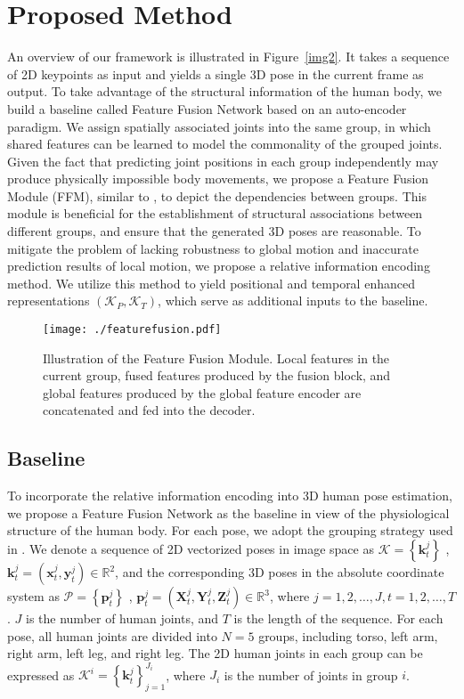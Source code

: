 \documentclass[sigconf]{acmart}
\begin{document}
\section{Proposed Method}
An overview of our framework is illustrated in Figure~\ref{img2}. It takes a sequence of 2D keypoints as input and yields a single 3D pose in the current frame as output. To take advantage of the structural information of the human body, we build a baseline called Feature Fusion Network based on an auto-encoder paradigm. We assign spatially associated joints into the same group, in which shared features can be learned to model the commonality of the grouped joints. Given the fact that predicting joint positions in each group independently may produce physically impossible body movements, we propose a Feature Fusion Module (FFM), similar to \cite{zeng2020srnet}, to depict the dependencies between groups. This module is beneficial for the establishment of structural associations between different groups, and ensure that the generated 3D poses are reasonable. To mitigate the problem of lacking robustness to global motion and inaccurate prediction results of local motion, we propose a relative information encoding method. We utilize this method to yield positional and temporal enhanced representations $(\mathcal{K}_{P},\mathcal{K}_{T})$, which serve as additional inputs to the baseline.

\begin{figure}
  \centering
  \texttt{[image: ./featurefusion.pdf]}
  \vspace{-0.4cm}
  \caption{Illustration of the Feature Fusion Module. Local features in the current group, fused features produced by the fusion block, and global features produced by the global feature encoder are concatenated and fed into the decoder.}
  \vspace{-0.3cm}
  \label{img3}
\end{figure}


\subsection{Baseline}\label{baseline}


To incorporate the relative information encoding into 3D human pose estimation, we propose a Feature Fusion Network as the baseline in view of the physiological structure of the human body. For each pose, we adopt the grouping strategy used in \cite{park20183d}. We denote a sequence of 2D vectorized poses in image space as $\mathcal{K}=\left\{\mathbf{k}^{j}_{t}\right\}$ , $\mathbf{k}^{j}_{t}={(\mathbf{x}^{j}_{t},\mathbf{y}^{j}_{t})} \in \mathbb{R}^{2}$, and the corresponding 3D poses in the absolute coordinate system as $\mathcal{P}=\left\{\mathbf{p}^{j}_{t}\right\}$ , $\mathbf{p}^{j}_{t}={(\mathbf{X}^{j}_{t},\mathbf{Y}^{j}_{t},\mathbf{Z}^{j}_{t})} \in \mathbb{R}^{3}$, where $j=1,2,\ldots,J, t=1,2,\ldots,T$. ${J}$ is the number of human joints, and ${T}$ is the length of the sequence. For each pose, all human joints are divided into $N=5$ groups, including torso, left arm, right arm, left leg, and right leg. The 2D human joints in each group can be expressed as $\mathcal{K}^{i}=\left\{\mathbf{k}^{j}_{t}\right\}_{j=1}^{J_i}$, where ${J_i}$ is the number of joints in group $i$. 
\end{document}
